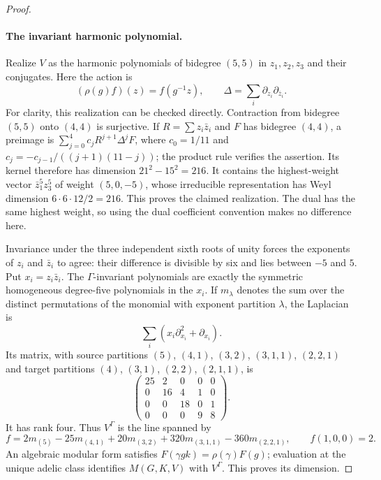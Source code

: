 \documentclass[11pt,a4paper]{article}
\theoremstyle{definition}
\begin{document}
\begin{proof}
\paragraph{The invariant harmonic polynomial.}
Realize $V$ as the harmonic polynomials of bidegree $(5,5)$ in
$z_1,z_2,z_3$ and their conjugates.  Here the action is
\[
       (\rho(g)f)(z)=f(g^{-1}z),\qquad
       \Delta=\sum_i\partial_{z_i}\partial_{\overline z_i}.
 \tag{UH.4}
\]
For clarity, this realization can be checked directly.  Contraction
from bidegree $(5,5)$ onto $(4,4)$ is surjective.  If $R=\sum z_i\bar z_i$
and $F$ has bidegree $(4,4)$, a preimage is
$\sum_{j=0}^4 c_jR^{j+1}\Delta^jF$, where
$c_0=1/11$ and $c_j=-c_{j-1}/((j+1)(11-j))$; the product rule verifies
the assertion.  Its kernel therefore has dimension $21^2-15^2=216$.
It contains the highest-weight vector $\bar z_1^5z_3^5$ of weight
$(5,0,-5)$, whose irreducible representation has Weyl dimension
$6\cdot6\cdot12/2=216$.  This proves the claimed realization.  The
dual has the same highest weight, so using the dual coefficient
convention makes no difference here.

Invariance under the three independent sixth roots of unity forces
the exponents of $z_i$ and $\bar z_i$ to agree: their difference is
divisible by six and lies between $-5$ and $5$.  Put $x_i=z_i\bar z_i$.
The $\Gamma$-invariant polynomials are exactly the symmetric
homogeneous degree-five polynomials in the $x_i$.  If $m_\lambda$
denotes the sum over the distinct permutations of the monomial with
exponent partition $\lambda$, the Laplacian is
\[
 \sum_i(x_i\partial_{x_i}^2+\partial_{x_i}).
\]
Its matrix, with source partitions $(5)$, $(4,1)$, $(3,2)$,
$(3,1,1)$, $(2,2,1)$ and target partitions $(4)$, $(3,1)$,
$(2,2)$, $(2,1,1)$, is
\[
 \begin{pmatrix}
 25&2&0&0&0\\
 0&16&4&1&0\\
 0&0&18&0&1\\
 0&0&0&9&8
 \end{pmatrix}.
 \tag{UH.5}
\]
It has rank four.  Thus $V^\Gamma$ is the line spanned by
\[
 f=2m_{(5)}-25m_{(4,1)}+20m_{(3,2)}
       +320m_{(3,1,1)}-360m_{(2,2,1)},
 \qquad f(1,0,0)=2.
 \tag{UH.6}
\]
An algebraic modular form satisfies
$F(\gamma gk)=\rho(\gamma)F(g)$; evaluation at the unique adelic
class identifies $M(G,K,V)$ with $V^\Gamma$.  This proves its dimension.


\end{proof}
\end{document}
